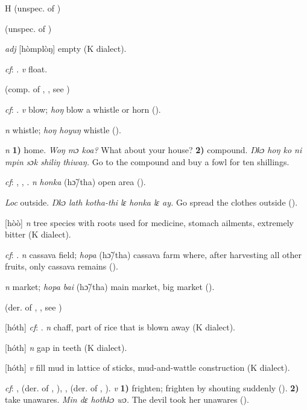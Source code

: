 \begin{letter}{H}
 (unspec. of ) 

 (unspec. of ) 

 \textit{adj} [hòmplòŋ] empty (K dialect). 

 \textit{cf}: . \textit{v} float.

 (comp. of , , see ) 

 \textit{cf}: . \textit{v} blow; \textit{hoŋ} blow a whistle or horn (\citealt{Pichl1967}).

 \textit{n} whistle; \textit{hoŋ hoyuŋ} whistle (\citealt{Pichl1967}). 

 \textit{n} \textbf{1)} home. \textit{Woŋ mɔ koa?} What about your house? \textbf{2)} compound. \textit{Ŋkɔ hoŋ ko ni mpin sɔk shiliŋ thiwaŋ.} Go to the compound and buy a fowl for ten shillings.

 \textit{cf}: , , . \textit{n} \textit{honka} (hɔ̃/tha) open area (\citealt{Pichl1967}).

 \textit{Loc} outside. \textit{Ŋkɔ lath kotha-thi lɛ honka lɛ ay.} Go spread the clothes outside (\citealt{Pichl1967}). 

 [hòò] \textit{n} tree species with roots used for medicine, stomach ailments, extremely bitter (K dialect). 

 \textit{cf}: . \textit{n} cassava field; \textit{hopa} (hɔ̃/tha) cassava farm where, after harvesting all other fruits, only cassava remains (\citealt{Pichl1967}). 

 \textit{n} market; \textit{hopa bai} (hɔ̃/tha) main market, big market (\citealt{Pichl1967}). 

 (der. of , , see ) 

 [hóth] \textit{cf}: . \textit{n} chaff, part of rice that is blown away (K dialect). 

 [hóth] \textit{n} gap in teeth (K dialect). 

 [hóth] \textit{v} fill mud in lattice of sticks, mud-and-wattle construction (K dialect). 

 \textit{cf}: ,  (der. of , ), ,  (der. of , ). \textit{v} \textbf{1)} frighten; \textit{} frighten by shouting suddenly (\citealt{Pichl1967}). \textbf{2)} take unawares. \textit{Min dɛ hothkɔ wɔ.} The devil took her unawares (\citealt{Pichl1967}).


\end{letter}
